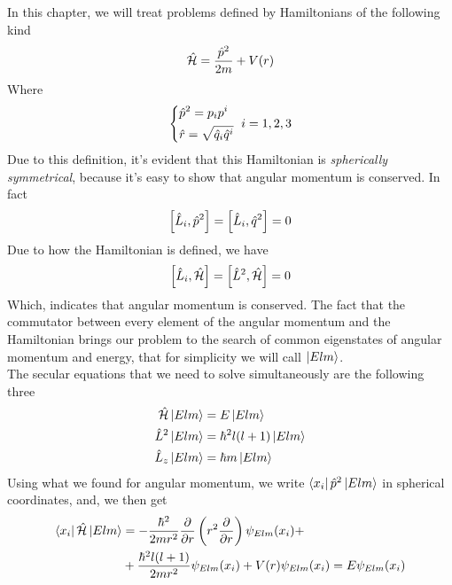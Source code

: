 \documentclass[../qm.tex]{subfiles}
\begin{document}
	In this chapter, we will treat problems defined by Hamiltonians of the following kind
	\begin{equation}
		\hat{\mathcal{H}}=\frac{\hat{p}^2}{2m}+V(r)
		\label{eq:centralpotentialham}
	\end{equation}
	Where
	\begin{equation*}
		\begin{dcases}
			\hat{p}^2=p_ip^i\\
			\hat{r}=\sqrt{\hat{q}_i\hat{q}^i}
		\end{dcases}\ i=1,2,3
	\end{equation*}
	Due to this definition, it's evident that this Hamiltonian is \textit{spherically symmetrical}, because it's easy to show that angular momentum is conserved. In fact
	\begin{equation*}
		\comm{\opr{L}_i}{\opr{p}^2}=\comm{\opr{L}_i}{\opr{q}^2}=0
	\end{equation*}
	Due to how the Hamiltonian is defined, we have
	\begin{equation}
		\comm{\opr{L}_i}{\opr{\ham}}=\comm{\opr{L}^2}{\opr{\ham}}=0
		\label{eq:conservationangmom}
	\end{equation}
	Which, indicates that angular momentum is conserved. The fact that the commutator between every element of the angular momentum and the Hamiltonian brings our problem to the search of common eigenstates of angular momentum and energy, that for simplicity we will call $\ket{Elm}$.\\
	The secular equations that we need to solve simultaneously are the following three
	\begin{equation}
		\begin{aligned}
			\hat{\mathcal{H}}\ket{Elm}&=E\ket{Elm}\\
			\hat{L}^2\ket{Elm}&=\hbar^2l(l+1)\ket{Elm}\\
			\hat{L}_z\ket{Elm}&=\hbar m\ket{Elm}
		\end{aligned}
		\label{eq:sphersimmseceq}
	\end{equation}
	Using what we found for angular momentum, we write $\bra{x_i}\hat{p}^2\ket{Elm}$ in spherical coordinates, and, we then get
	\begin{equation}
		\begin{aligned}
			\bra{x_i}\hat{\mathcal{H}}\ket{Elm}&=-\frac{\hbar^2}{2mr^2}\pdv{r}\left( r^2\pdv{r} \right)\psi_{Elm}(x_i)+\\
			&+\frac{\hbar^2l(l+1)}{2mr^2}\psi_{Elm}(x_i)+V(r)\psi_{Elm}(x_i)=E\psi_{Elm}(x_i)
		\end{aligned}
		\label{eq:schreqcentralpot}
	\end{equation}
\end{document}
